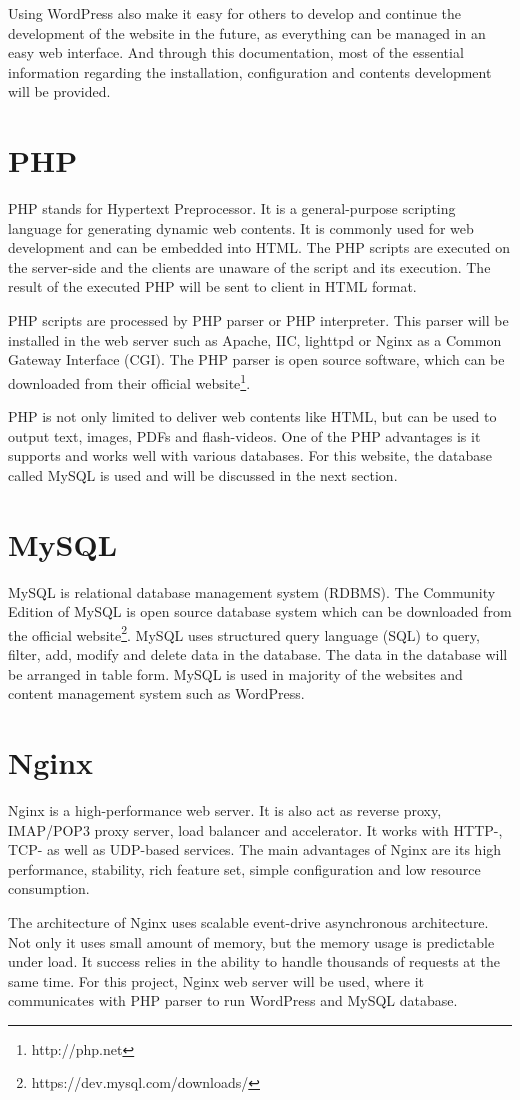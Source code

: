 Using WordPress also make it easy for others to develop and continue the development of the website in the future, as everything can be managed in an easy web interface. And through this documentation, most of the essential information regarding the installation, configuration and contents development will be provided.

\section{PHP}
PHP stands for Hypertext Preprocessor. It is a general-purpose scripting language for generating dynamic web contents. It is commonly used for web development and can be embedded into HTML. The PHP scripts are executed on the server-side and the clients are unaware of the script and its execution. The result of the executed PHP will be sent to client in HTML format.

PHP scripts are processed by PHP parser or PHP interpreter. This parser will be installed in the web server such as Apache, IIC, lighttpd or Nginx as a Common Gateway Interface (CGI). The PHP parser is open source software, which can be downloaded from their official website\footnote{http://php.net}.

PHP is not only limited to deliver web contents like HTML, but can be used to output text, images, PDFs and flash-videos. One of the PHP advantages is it supports and works well with various databases. For this website, the database called MySQL is used and will be discussed in the next section.

\section{MySQL}
MySQL is relational database management system (RDBMS). The Community Edition of MySQL is open source database system which can be downloaded from the official website\footnote{https://dev.mysql.com/downloads/}. MySQL uses structured query language (SQL) to query, filter, add, modify and delete data in the database. The data in the database will be arranged in table form. MySQL is used in majority of the websites and content management system such as WordPress.

\section{Nginx}
Nginx is a high-performance web server. It is also act as reverse proxy, IMAP/POP3 proxy server, load balancer and accelerator. It works with HTTP-, TCP- as well as UDP-based services. The main advantages of Nginx are its high performance, stability, rich feature set, simple configuration and low resource consumption.

The architecture of Nginx uses scalable event-drive asynchronous architecture. Not only it uses small amount of memory, but the memory usage is predictable under load. It success relies in the ability to handle thousands of requests at the same time. For this project, Nginx web server will be used, where it communicates with PHP parser to run WordPress and MySQL database.

